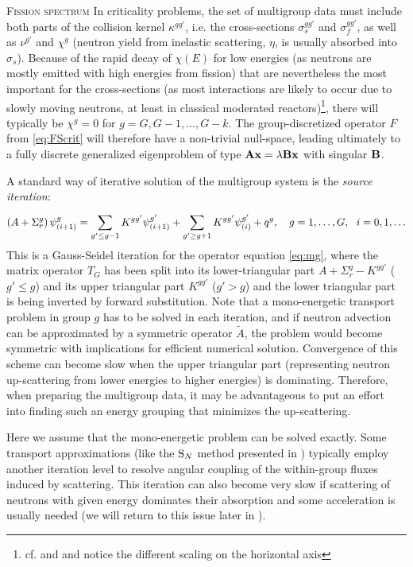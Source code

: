 \begin{remark}{\textsc{Fission spectrum}}
In criticality problems, the set of multigroup data must include both parts of the collision kernel
$\kappa^{gg'}$, i.e. the cross-sections $\sigma_s^{gg'}$ and $\sigma_f^{gg'}$, as well as $\nu^{g'}$ and
$\chi^g$ (neutron yield from inelastic scattering, $\eta$, is usually absorbed into $\sigma_s$). Because of the rapid
decay of $\chi(E)$ for low energies (as neutrons are mostly emitted with high energies from fission) that are
nevertheless the most important for the cross-sections (as most interactions are likely to occur due to slowly moving
neutrons, at least in classical moderated reactors)\footnote{cf.  and  and notice the
different scaling on the horizontal axis}, there will typically be $\chi^g = 0$ for $g = G,G-1,\ldots,G-k$. The
group-discretized operator $F$ from \eqref{eq:FScrit} will therefore have a non-trivial null-space, leading ultimately
to a fully discrete generalized eigenproblem of type $\mathbf{A}\mathbf{x} = \lambda\mathbf{B}\mathbf{x}$ with singular $\mathbf{B}$.
\end{remark}

A standard way of iterative solution of the multigroup system is the \textit{source iteration}:
\begin{equation}\label{eq:MGGS}
	\left(A + \Sigma_r^g\right)\psi^g_{(i+1)} = \sum_{g'\leq g-1}^{} K^{gg'}\psi^{g'}_{(i+1)} + \sum_{g' \geq g+1}^{}
  K^{gg'}\psi^{g'}_{(i)} + q^g,\quad g = 1,\ldots,G,\ \ i = 0,1,\ldots
\end{equation}
  This is a Gauss-Seidel iteration for the operator equation \eqref{eq:mg}, where the matrix operator $T_G$ has been
split into its lower-triangular part $A + \Sigma_r^g - K^{gg'}$ ($g'\leq g$) and its upper triangular part $K^{gg'}$
($g'> g$) and the lower triangular part is being inverted by forward substitution.
Note that a mono-energetic transport problem in group $g$ has to be solved in each iteration, and if neutron advection
can be approximated by a symmetric operator $\tilde A$, the problem would become symmetric with implications for
efficient numerical solution. Convergence of this 
scheme can become slow when the upper triangular part (representing neutron up-scattering from lower energies to 
higher energies) is dominating. Therefore, when preparing the multigroup data, it may be advantageous to put an effort
into finding such an energy grouping that minimizes the up-scattering.
\begin{remark}\label{rem:SI}
Here we assume that the
mono-energetic problem can be solved exactly. Some transport approximations (like the $\text{S}_{N}$ method presented in
) typically employ another iteration level to resolve angular coupling of the within-group fluxes
induced by scattering. This iteration can also become very slow if scattering of
neutrons with given energy dominates their absorption and some acceleration is usually needed (we will return to this
issue later in ).
\end{remark}

